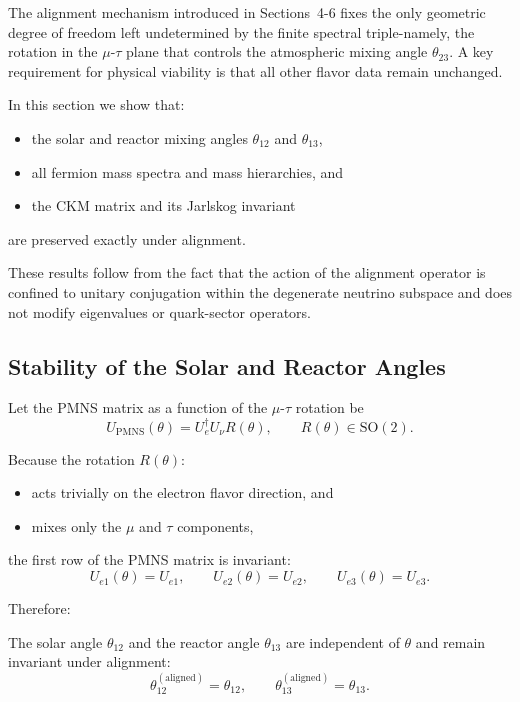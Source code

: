 The alignment mechanism introduced in Sections~4-6 fixes the only geometric degree of freedom left undetermined by the finite spectral triple-namely, the rotation in the $\mu$-$\tau$ plane that controls the atmospheric mixing angle $\theta_{23}$. A key requirement for physical viability is that all other flavor data remain unchanged.

In this section we show that:
\begin{itemize}
\item the solar and reactor mixing angles $\theta_{12}$ and $\theta_{13}$,
\item all fermion mass spectra and mass hierarchies, and
\item the CKM matrix and its Jarlskog invariant
\end{itemize}
are preserved exactly under alignment.

These results follow from the fact that the action of the alignment operator is confined to unitary conjugation within the degenerate neutrino subspace and does not modify eigenvalues or quark-sector operators.

\subsection{Stability of the Solar and Reactor Angles}

Let the PMNS matrix as a function of the $\mu$-$\tau$ rotation be
\[
U_{\mathrm{PMNS}}(\theta)=U_e^\dagger U_\nu R(\theta),
\qquad R(\theta)\in\mathrm{SO}(2).
\]

Because the rotation $R(\theta)$:
\begin{itemize}
\item acts trivially on the electron flavor direction, and
\item mixes only the $\mu$ and $\tau$ components,
\end{itemize}
the first row of the PMNS matrix is invariant:
\[
U_{e1}(\theta)=U_{e1},\qquad
U_{e2}(\theta)=U_{e2},\qquad
U_{e3}(\theta)=U_{e3}.
\]

Therefore:

\begin{corollary}
The solar angle $\theta_{12}$ and the reactor angle $\theta_{13}$ are independent of $\theta$ and remain invariant under alignment:
\[
\theta_{12}^{(\mathrm{aligned})}=\theta_{12},
\qquad
\theta_{13}^{(\mathrm{aligned})}=\theta_{13}.
\]
\end{corollary}

